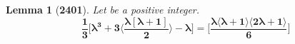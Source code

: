 \documentclass[preview]{standalone}
\newtheorem*{lemma*}{Lemma}
\begin{document}
\begin{lemma*}[\textbf{2401}]
    Let \bm{$\lambda$} be a positive integer.
    \begin{equation*}
        \bm{
            \frac{1}{3} 
            \bigg[ 
                \lambda^3 
                    + 
                3 \bigg \langle 
                    \frac{ \lambda [ \lambda + 1 ] }{2} 
                \bigg \rangle
                    - 
                    \lambda 
            \bigg] 
                =
            \bigg[
                \frac{
                    \lambda
                    \langle \lambda + 1 \rangle 
                    \langle 2 \lambda + 1 \rangle}
                    {6}
            \bigg]
        }
    \end{equation*}
\end{lemma*}
\end{document}
